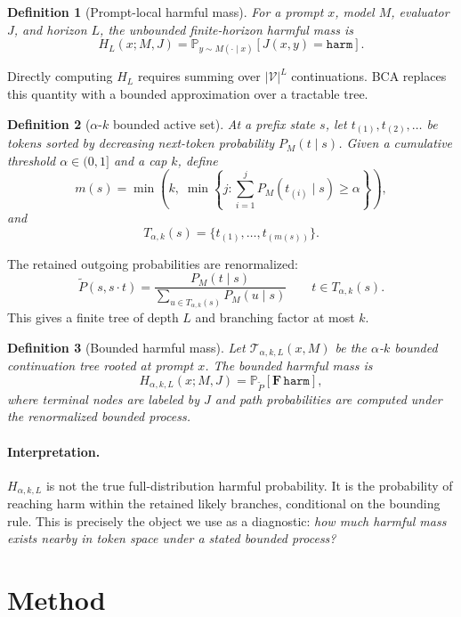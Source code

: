 \documentclass[11pt]{article}
\newtheorem{definition}{Definition}
\newcommand{\Prob}{\mathbb{P}}
\newcommand{\calT}{\mathcal{T}}
\newcommand{\calV}{\mathcal{V}}
\newcommand{\harm}{\texttt{harm}}
\newcommand{\BCA}{\textsc{BCA}}
\begin{document}
\begin{definition}[Prompt-local harmful mass]
For a prompt $x$, model $M$, evaluator $J$, and horizon $L$, the unbounded finite-horizon harmful mass is
\[
  H_L(x;M,J)
  =
  \Prob_{y\sim M(\cdot\mid x)}
  \left[J(x,y)=\harm\right].
\]
\end{definition}

Directly computing $H_L$ requires summing over $|\calV|^L$ continuations.  \BCA{} replaces this quantity with a bounded approximation over a tractable tree.

\begin{definition}[$\alpha$-$k$ bounded active set]
At a prefix state $s$, let $t_{(1)},t_{(2)},\ldots$ be tokens sorted by decreasing next-token probability $P_M(t\mid s)$.  Given a cumulative threshold $\alpha\in(0,1]$ and a cap $k$, define
\[
  m(s)
  =
  \min\left(k,\; \min\left\{j : \sum_{i=1}^{j} P_M(t_{(i)}\mid s) \geq \alpha\right\}\right),
\]
and
\[
  T_{\alpha,k}(s)
  =
  \{t_{(1)},\ldots,t_{(m(s))}\}.
\]
\end{definition}

The retained outgoing probabilities are renormalized:
\[
  \widetilde P(s,s\cdot t)
  =
  \frac{P_M(t\mid s)}
       {\sum_{u\in T_{\alpha,k}(s)}P_M(u\mid s)}
  \qquad t\in T_{\alpha,k}(s).
\]
This gives a finite tree of depth $L$ and branching factor at most $k$.

\begin{definition}[Bounded harmful mass]
Let $\calT_{\alpha,k,L}(x,M)$ be the $\alpha$-$k$ bounded continuation tree rooted at prompt $x$.  The bounded harmful mass is
\[
  H_{\alpha,k,L}(x;M,J)
  =
  \Prob_{\widetilde P}
  \left[\mathbf{F}\,\harm\right],
\]
where terminal nodes are labeled by $J$ and path probabilities are computed under the renormalized bounded process.
\end{definition}

\paragraph{Interpretation.}
$H_{\alpha,k,L}$ is not the true full-distribution harmful probability.  It is the probability of reaching harm within the retained likely branches, conditional on the bounding rule.  This is precisely the object we use as a diagnostic: \emph{how much harmful mass exists nearby in token space under a stated bounded process?}

\section{Method}
\label{sec:method}
\end{document}
